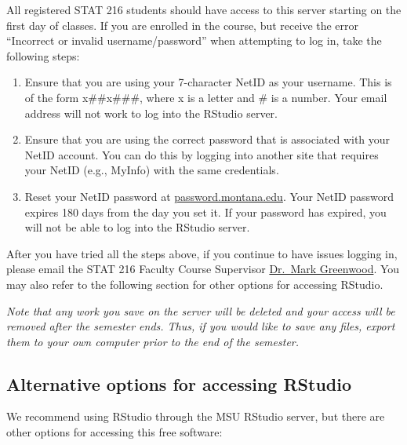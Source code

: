 \documentclass[
  10pt,
  openany]{book}
\providecommand{\tightlist}{%
  \setlength{\itemsep}{0pt}\setlength{\parskip}{0pt}}
\theoremstyle{definition}
\theoremstyle{definition}
\theoremstyle{definition}
\theoremstyle{definition}
\theoremstyle{remark}
\begin{document}
All registered STAT 216 students should have access to this server starting on the first day of classes. If you are enrolled in the course, but receive the error ``Incorrect or invalid username/password'' when attempting to log in, take the following steps:

\begin{enumerate}
\def\labelenumi{\arabic{enumi}.}
\tightlist
\item
  Ensure that you are using your 7-character NetID as your username. This is of the form x\#\#x\#\#\#, where x is a letter and \# is a number. Your email address will not work to log into the RStudio server.\\
\item
  Ensure that you are using the correct password that is associated with your NetID account. You can do this by logging into another site that requires your NetID (e.g., MyInfo) with the same credentials.
\item
  Reset your NetID password at \href{http://password.montana.edu/}{password.montana.edu}. Your NetID password expires 180 days from the day you set it. If your password has expired, you will not be able to log into the RStudio server.
\end{enumerate}

After you have tried all the steps above, if you continue to have issues logging in, please email the STAT 216 Faculty Course Supervisor \href{mailto:greenwood@montana.edu}{Dr.~Mark Greenwood}.
You may also refer to the following section for other options for accessing RStudio.

\emph{Note that any work you save on the server will be deleted and your access will be removed after the semester ends. Thus, if you would like to save any files, export them to your own computer prior to the end of the semester.}

\subsection*{Alternative options for accessing RStudio}\label{alternative-options-for-accessing-rstudio}

We recommend using RStudio through the MSU RStudio server, but there are other options for accessing this free software:
\end{document}
